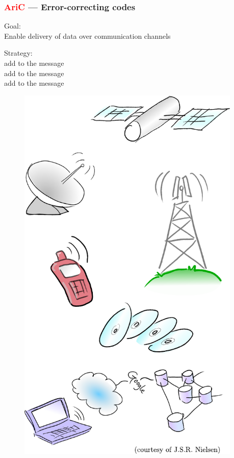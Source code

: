 \documentclass[c]{beamer}
\begin{document}
\begin{frame}
	\frametitle{\textcolor{red}{AriC} --- Error-correcting codes}

\begin{minipage}{0.53\textwidth}
	\begin{small}
	Goal:\\
	Enable  delivery of data over 
	 communication channels

	\bigskip
	Strategy:\\
	add  to the message\\
	add  to the message\\
	add  to the message
	\end{small}
	\end{minipage}
	\begin{minipage}{0.45\textwidth}
	\begin{figure}
		\centering
		\includegraphics[width=0.95\textwidth]{JDD2014/figures/codes_applications.pdf}
	\end{figure}
	\end{minipage}
\end{frame}
\end{document}
